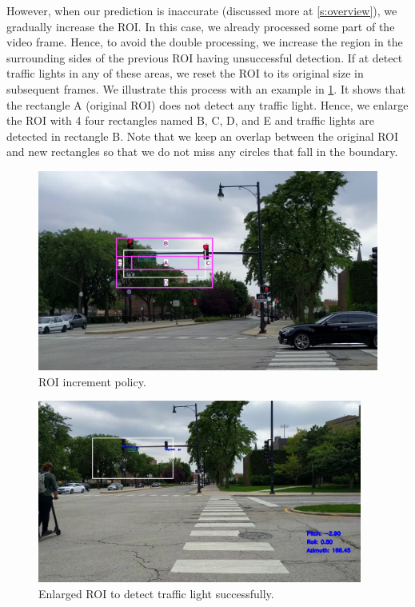 

However, when our prediction is inaccurate (discussed more at \ref{s:overview}), we gradually increase the ROI.
In this case, we already processed some part of the video frame. 
Hence, to avoid the double processing, we increase the region in the surrounding sides of the previous ROI having unsuccessful detection.
If at detect traffic lights in any of these areas, we reset the ROI to its original size in subsequent frames.
We illustrate this process with an example in \ref{f:rectangle}.
It shows that the rectangle A (original ROI) does not detect any traffic light.
Hence, we enlarge the ROI with 4 four rectangles named B, C, D, and E and traffic lights are detected in rectangle B.
Note that  we keep an overlap between the original ROI and new rectangles so that we do not miss any circles that fall in the boundary. 


\begin{figure}[!ht]
\centering
\includegraphics[width=5.2in]{figures/rectangle.pdf}
\caption{ROI increment policy.}
\label{f:rectangle}
\end{figure}

\begin{figure}[!ht]
  \centering
  \includegraphics[width=4.2in]{images/rec_enl.jpg}
  \caption{Enlarged ROI to detect traffic light successfully.}
  \label{f:enl}
\end{figure}

